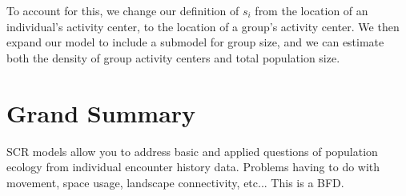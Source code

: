 To account for this, we change our definition of $s_i$ from the
location of an individual's activity center, to the location of a
group's activity center. We then expand our model to include a
submodel for group size, and we can estimate both the density of group
activity centers and total population size.


\section{Grand Summary}


SCR models allow you to address basic and applied questions of
population ecology from individual encounter history data. Problems
having to do with movement, space usage, landscape connectivity,
etc... This is a BFD. 

